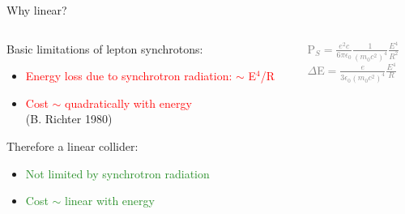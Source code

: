 \documentclass[xcolor={dvipsnames}]{beamer}
\begin{document}
\begin{frame}{Why linear?}
\begin{columns}
 \begin{column}{0.6\textwidth}
  Basic limitations of lepton synchrotons:
\begin{itemize}
 \item \textcolor{Red}{Energy loss due to synchrotron radiation: $\sim$ E$^4$/R}
 \item \textcolor{Red}{Cost $\sim$ quadratically with energy}\\ \tiny{(B. Richter 
1980)}
\end{itemize}
\vspace*{1cm}
Therefore a linear collider:
\begin{itemize}
 \item \textcolor{ForestGreen}{Not limited by synchrotron radiation}
 \item \textcolor{ForestGreen}{Cost $\sim$ linear with energy}
\end{itemize}
 \end{column}
 \begin{column}{0.4\textwidth}
 \begin{block}{}
  \begin{center}
      \textcolor{Gray}{P$_S=\frac{e^2c}{6\pi\epsilon_0}\frac{1}{(m_0c^2)^4}\frac{E^4}{R^2}$\\
  $\Delta$E$=\frac{e}{3\epsilon_0(m_0c^2)^4}\frac{E^4}{R}$}
   \end{center}
 \end{block}
 \end{column}
\end{columns}

\end{frame}


\end{document}
